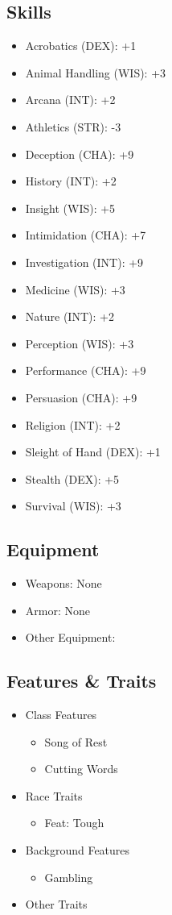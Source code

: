 \documentclass[11pt]{article}
\begin{document}
\subsection{Skills}
\label{sec:orga10861f}
\begin{itemize}
\item Acrobatics (DEX): +1
\item Animal Handling (WIS): +3
\item Arcana (INT): +2
\item Athletics (STR): -3
\item Deception (CHA): +9
\item History (INT): +2
\item Insight (WIS): +5
\item Intimidation (CHA): +7
\item Investigation (INT): +9
\item Medicine (WIS): +3
\item Nature (INT): +2
\item Perception (WIS): +3
\item Performance (CHA): +9
\item Persuasion (CHA): +9
\item Religion (INT): +2
\item Sleight of Hand (DEX): +1
\item Stealth (DEX): +5
\item Survival (WIS): +3
\end{itemize}
\subsection{Equipment}
\label{sec:org576a5e6}
\begin{itemize}
\item Weapons: None
\item Armor: None
\item Other Equipment:
\end{itemize}
\subsection{Features \& Traits}
\label{sec:org9bab097}
\begin{itemize}
\item Class Features
\begin{itemize}
\item Song of Rest
\item Cutting Words
\end{itemize}
\item Race Traits
\begin{itemize}
\item Feat: Tough
\end{itemize}
\item Background Features
\begin{itemize}
\item Gambling
\end{itemize}
\item Other Traits
\end{itemize}
\end{document}
